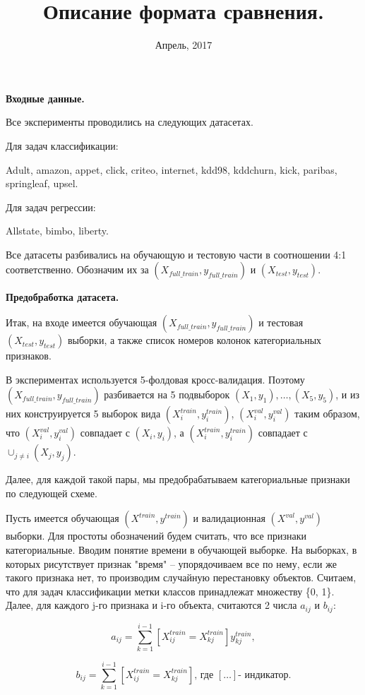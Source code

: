 \documentclass{article}
\title{Описание формата сравнения.}
\date{Апрель, 2017}
\begin{document}
\maketitle
\noindent\textbf{Входные данные.}
\medskip

Все эксперименты проводились на следующих датасетах.

Для задач классификации:

\noindent Adult, amazon, appet, click, criteo, internet, kdd98, kddchurn, kick, paribas, springleaf, upsel.

Для задач регрессии:

\noindent Allstate, bimbo, liberty.

Все датасеты разбивались на обучающую и тестовую части в соотношении 4:1 соответственно. Обозначим их за $(X_{full\_train}, y_{full\_train})$ и $(X_{test}, y_{test})$.

\medskip
\noindent\textbf{Предобработка датасета.}
\medskip

Итак, на входе имеется обучающая $(X_{full\_train}, y_{full\_train})$ и тестовая $(X_{test}, y_{test})$ выборки, а также список номеров колонок категориальных признаков.

В экспериментах используется 5-фолдовая кросс-валидация. Поэтому $(X_{full\_train}, y_{full\_train})$ разбивается на 5 подвыборок $(X_1, y_1), \dots, (X_5, y_5)$, и из них конструируется 5 выборок вида $(X^{train}_i, y^{train}_i)$, $(X^{val}_i, y^{val}_i)$ таким образом, что $(X^{val}_i, y^{val}_i)$ совпадает с $(X_i, y_i)$, а $(X^{train}_i,y^{train}_i)$ совпадает с $\cup_{j\neq i}(X_j, y_j)$.

Далее, для каждой такой пары, мы предобрабатываем категориальные признаки по следующей схеме.

Пусть имеется обучающая $(X^{train}, y^{train})$ и валидационная $(X^{val}, y^{val})$ выборки. Для простоты обозначений будем считать, что все признаки категориальные. Вводим понятие времени в обучающей выборке.
На выборках, в которых рисутствует признак "время" \--- упорядочиваем все по нему, если же такого признака нет, то производим случайную перестановку объектов. Считаем, что для задач классификации метки классов принадлежат множеству \{0, 1\}. Далее, для каждого j-го признака и i-го объекта, считаются 2 числа $a_{ij}$ и $b_{ij}$:

$$a_{ij} = \sum_{k=1}^{i - 1}[X^{train}_{ij} = X^{train}_{kj}]y^{train}_{kj},$$

$$b_{ij} = \sum_{k=1}^{i - 1}[X^{train}_{ij} = X^{train}_{kj}] \text{, где } [\dots] \text{- индикатор.}$$
\end{document}
